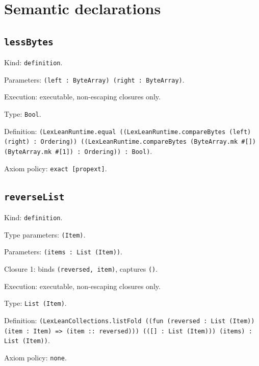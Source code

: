 \documentclass[11pt]{article}
\begin{document}
\section*{Semantic declarations}
\subsection*{\texttt{lessBytes}}
\noindent Kind: \texttt{definition}.\par
\noindent Parameters: \texttt{(left : ByteArray) (right : ByteArray)}.\par
\noindent Execution: executable, non-escaping closures only.\par
\noindent Type: \texttt{Bool}.\par
\noindent Definition: \texttt{(LexLeanRuntime.equal ((LexLeanRuntime.compareBytes (left) (right) : Ordering)) ((LexLeanRuntime.compareBytes (ByteArray.mk \#[]) (ByteArray.mk \#[1]) : Ordering)) : Bool)}.\par
\noindent Axiom policy: \texttt{exact [propext]}.\par
\subsection*{\texttt{reverseList}}
\noindent Kind: \texttt{definition}.\par
\noindent Type parameters: \texttt{(Item)}.\par
\noindent Parameters: \texttt{(items : List (Item))}.\par
\noindent Closure 1: binds \texttt{(reversed, item)}, captures \texttt{()}.\par
\noindent Execution: executable, non-escaping closures only.\par
\noindent Type: \texttt{List (Item)}.\par
\noindent Definition: \texttt{(LexLeanCollections.listFold ((fun (reversed : List (Item)) (item : Item) => (item :: reversed))) (([] : List (Item))) (items) : List (Item))}.\par
\noindent Axiom policy: \texttt{none}.\par
\end{document}
